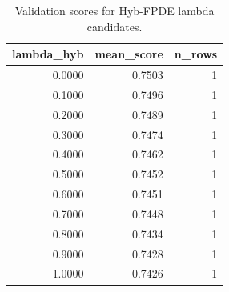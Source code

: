 \begin{table}[t]
\caption{Validation scores for Hyb-FPDE lambda candidates.}
\label{tab:lambda_distribution_computed}
\centering
\begin{tabular}{rrr}
\toprule
lambda\_hyb & mean\_score & n\_rows \\
\midrule
0.0000 & 0.7503 & 1 \\
0.1000 & 0.7496 & 1 \\
0.2000 & 0.7489 & 1 \\
0.3000 & 0.7474 & 1 \\
0.4000 & 0.7462 & 1 \\
0.5000 & 0.7452 & 1 \\
0.6000 & 0.7451 & 1 \\
0.7000 & 0.7448 & 1 \\
0.8000 & 0.7434 & 1 \\
0.9000 & 0.7428 & 1 \\
1.0000 & 0.7426 & 1 \\
\bottomrule
\end{tabular}

\end{table}
